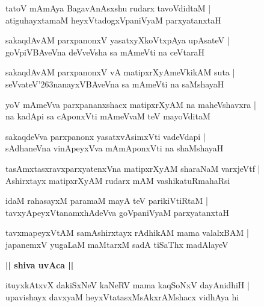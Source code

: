 \documentclass[twoside,12pt,openright]{book}
\def\S{\char'263}
\newcounter{shloka}[chapter]
\def\uvaca#1{\centerline{{\large\textbf{#1}}}}
\begin{document}
\begin{shloka}%
tatoV mAmAya BagavAnAsxshu rudarx tavoVdidtaM |\\
atiguhayxtamaM heyxVtadogxVpaniVyaM parxyatanxtaH 
\end{shloka}

\begin{shloka}%
sakaqdAvAM parxpanonxV yasatxyXkoVtxpAya upAsateV |\\
goVpiVBAveVna deVveVsha sa mAmeVti na ceVtaraH 
\end{shloka}

\begin{shloka}%
sakaqdAvAM parxpanonxV vA matipxrXyAmeVkikAM suta |\\
seVvateV\S nanayxVBAveVna sa mAmeVti na saMshayaH 
\end{shloka}

\begin{shloka}%
yoV mAmeVva parxpananxshacx matipxrXyAM na maheVshavxra |\\
na  kadApi sa cAponxVti mAmeVvaM teV mayoVditaM 
\end{shloka}

\begin{shloka}%
sakaqdeVva parxpanonx yasatxvAsimxVti vadeVdapi |\\
sAdhaneVna vinApeyxVva mAmAponxVti na shaMshayaH 
\end{shloka}

\begin{shloka}%
tasAmxtasxravxparxyatenxVna matipxrXyAM sharaNaM varxjeVtf |\\
Ashirxtayx matipxrXyAM rudarx mAM vashikatuRmahaRsi
\end{shloka}

\begin{shloka}%
idaM rahasayxM paramaM mayA teV parikiVtiRtaM |\\
tavxyApeyxVtanamxhAdeVva goVpaniVyaM parxyatanxtaH 
\end{shloka}

\begin{shloka}%
tavxmapeyxVtAM samAshirxtayx rAdhikAM mama valalxBAM |\\
japanemxV yugaLaM maMtarxM sadA tiSaThx madAlayeV 
\end{shloka}

\uvaca{|| shiva uvAca ||}

\begin{shloka}%
ituyxkAtxvX dakiSxNeV kaNeRV mama kaqSoNxV dayAnidhiH |\\
upavishayx davxyaM heyxVtatasxMsAkxrAMshacx vidhAya hi
\end{shloka}
\end{document}
